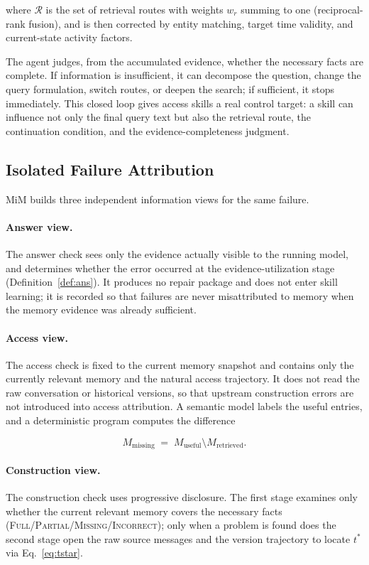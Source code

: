 \documentclass[11pt]{article}
\newcommand{\RR}{\mathcal{R}}
\begin{document}
\noindent where $\RR$ is the set of retrieval routes with weights $w_r$ summing
to one (reciprocal-rank fusion), and is then corrected by entity matching, target
time validity, and current-state activity factors.

The agent judges, from the accumulated evidence, whether the necessary facts are
complete. If information is insufficient, it can decompose the question, change
the query formulation, switch routes, or deepen the search; if sufficient, it
stops immediately. This closed loop gives access skills a real control target:
a skill can influence not only the final query text but also the retrieval
route, the continuation condition, and the evidence-completeness judgment.

\subsection{Isolated Failure Attribution}
\label{sec:method-attribution}

MiM builds three independent information views for the same failure.

\paragraph{Answer view.}
The answer check sees only the evidence actually visible to the running model,
and determines whether the error occurred at the evidence-utilization stage
(Definition~\ref{def:ans}). It produces no repair package and does not enter
skill learning; it is recorded so that failures are never misattributed to
memory when the memory evidence was already sufficient.

\paragraph{Access view.}
The access check is fixed to the current memory snapshot and contains only the
currently relevant memory and the natural access trajectory. It does not read
the raw conversation or historical versions, so that upstream construction
errors are not introduced into access attribution. A semantic model labels the
useful entries, and a deterministic program computes the difference

\begin{equation}
\label{eq:missing}
M_{\mathrm{missing}} \;=\; M_{\mathrm{useful}} \setminus M_{\mathrm{retrieved}}.
\end{equation}

\paragraph{Construction view.}
The construction check uses progressive disclosure. The first stage examines
only whether the current relevant memory covers the necessary facts
(\textsc{Full}/\textsc{Partial}/\textsc{Missing}/\textsc{Incorrect}); only when
a problem is found does the second stage open the raw source messages and the
version trajectory to locate $t^{*}$ via Eq.~\eqref{eq:tstar}.
\end{document}
